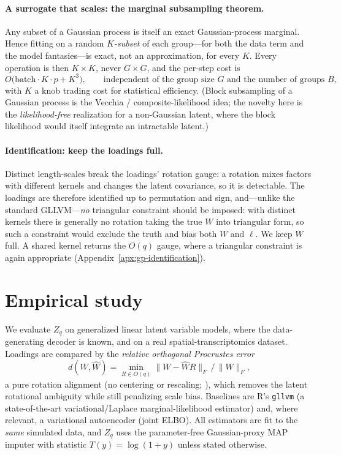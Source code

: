 \documentclass[twoside,11pt]{article}
\begin{document}
\paragraph{A surrogate that scales: the marginal subsampling theorem.}
Any subset of a Gaussian process is itself an exact Gaussian-process marginal. Hence fitting on a random \emph{$K$-subset} of each group---for both the data term and the model fantasies---is exact, not an approximation, for every $K$. Every operation is then $K\times K$, never $G\times G$, and the per-step cost is
\[
O\!\big(\text{batch}\cdot K\cdot p + K^3\big),\qquad\text{independent of the group size }G\text{ and the number of groups }B,
\]
with $K$ a knob trading cost for statistical efficiency. (Block subsampling of a Gaussian process is the Vecchia / composite-likelihood idea; the novelty here is the \emph{likelihood-free} realization for a non-Gaussian latent, where the block likelihood would itself integrate an intractable latent.)

\paragraph{Identification: keep the loadings full.}
Distinct length-scales break the loadings' rotation gauge: a rotation mixes factors with different kernels and changes the latent covariance, so it is detectable. The loadings are therefore identified up to permutation and sign, and---unlike the standard GLLVM---\emph{no} triangular constraint should be imposed: with distinct kernels there is generally no rotation taking the true $W$ into triangular form, so such a constraint would exclude the truth and bias both $W$ and $\ell$. We keep $W$ full. A shared kernel returns the $O(q)$ gauge, where a triangular constraint is again appropriate (Appendix~\ref{apx:gp-identification}).

%
\section{Empirical study}
\label{sec:sims}

We evaluate $Z_q$ on generalized linear latent variable models, where the data-generating decoder is known, and on a real spatial-transcriptomics dataset. Loadings are compared by the \emph{relative orthogonal Procrustes error}
\[
d(W,\hat W)=\min_{R\in O(q)}\|W-\hat W R\|_F\,/\,\|W\|_F,
\]
a pure rotation alignment (no centering or rescaling; \citealp{schoenemann1966}), which removes the latent rotational ambiguity while still penalizing scale bias. Baselines are R's \texttt{gllvm} (a state-of-the-art variational/Laplace marginal-likelihood estimator) and, where relevant, a variational autoencoder (joint ELBO). All estimators are fit to the \emph{same} simulated data, and $Z_q$ uses the parameter-free Gaussian-proxy MAP imputer with statistic $T(y)=\log(1+y)$ unless stated otherwise.
\end{document}
